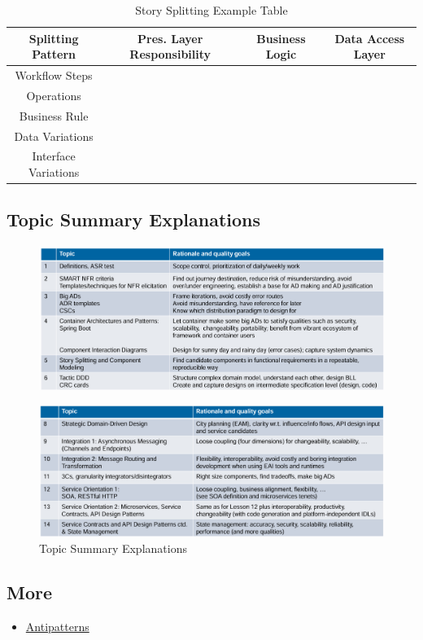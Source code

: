 \documentclass[../Main.tex]{subfiles}
\begin{document}
\begin{table}
    \centering
    \begin{tabular}{|c|c|c|c|} \hline 
        Splitting Pattern&  Pres. Layer Responsibility &  Business Logic& Data Access Layer\\ \hline 
        Workflow Steps&  &  & \\ \hline 
        Operations&  &  & \\ \hline 
        Business Rule&  &  & \\ \hline 
        Data Variations&  &  & \\ \hline 
        Interface Variations& & &\\ \hline
    \end{tabular}
    \caption{Story Splitting Example Table}
\end{table}

\subsection{Topic Summary Explanations}
\begin{figure}[H]
    \centering
    \includegraphics[width=1\linewidth]{Images/topic-summary-explanation.png}
\end{figure}
\begin{figure}[H]
    \centering
    \includegraphics[width=1\linewidth]{Images/topic-summary-explanation-1.png}
    \caption{Topic Summary Explanations}
\end{figure}

\subsection{More}
\begin{itemize}
    \item \href{https://architecture-antipatterns.tech/}{Antipatterns}
\end{itemize}
\end{document}
